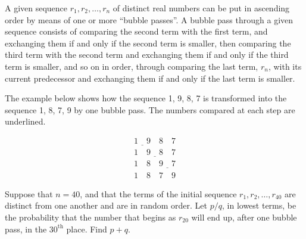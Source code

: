 A given sequence $r_1, r_2, \dots, r_n$ of distinct real numbers can be put in ascending order by means of one or more ``bubble passes''.  A bubble pass through a given sequence consists of comparing the second term with the first term, and exchanging them if and only if the second term is smaller, then comparing the third term with the second term and exchanging them if and only if the third term is smaller, and so on in order, through comparing the last term, $r_n$, with its current predecessor and exchanging them if and only if the last term is smaller.

The example below shows how the sequence 1, 9, 8, 7 is transformed into the sequence 1, 8, 7, 9 by one bubble pass.  The numbers compared at each step are underlined.

\[ \begin{array}{c} \underline{1 \quad 9} \quad 8 \quad 7 \\ 1 \quad \underline{9 \quad 8} \quad 7 \\ 1 \quad 8 \quad \underline{9 \quad 7} \\ 1 \quad 8 \quad 7 \quad 9 \end{array}  \]

Suppose that $n = 40$, and that the terms of the initial sequence $r_1, r_2, \dots, r_{40}$ are distinct from one another and are in random order.  Let $p/q$, in lowest terms, be the probability that the number that begins as $r_{20}$ will end up, after one bubble pass, in the $30^{\text{th}}$ place.  Find $p + q$.